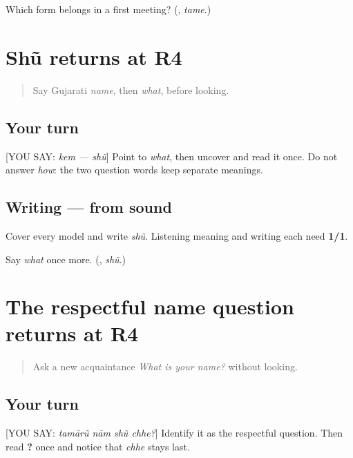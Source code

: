 \begin{tcolorbox}[breakable,colback=teal!4,colframe=teal!35!black,title={Before you move on}]
Which form belongs in a first meeting? (\textbf{}, \emph{tame}.)
\end{tcolorbox}
\section[Practice]{Shũ returns at R4}

\label{lesson:GU-R17-shun-r4}



\begin{quote}
Say Gujarati \emph{name}, then \emph{what}, before looking.
\end{quote}

\subsection*{Your turn}
{[}YOU SAY: \emph{kem — shũ}{]} Point to \emph{what}, then uncover \textbf{} and read it once. Do not answer \emph{how}: the two question words keep separate meanings.

\subsection*{Writing — from sound}
Cover every model and write \emph{shũ}. Listening meaning and writing each need \textbf{1/1}.

\begin{tcolorbox}[breakable,colback=teal!4,colframe=teal!35!black,title={Before you move on}]
Say \emph{what} once more. (\textbf{}, \emph{shũ}.)
\end{tcolorbox}
\section[Practice]{The respectful name question returns at R4}

\label{lesson:GU-R17-whats-your-name-r4}



\begin{quote}
Ask a new acquaintance \emph{What is your name?} without looking.
\end{quote}

\subsection*{Your turn}
{[}YOU SAY: \emph{tamārũ nām shũ chhe?}{]} Identify it as the respectful question. Then read \textbf{   ?} once and notice that \emph{chhe} stays last.

